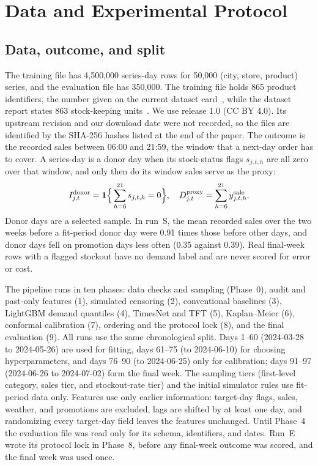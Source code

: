 \section{Data and Experimental Protocol}
\label{sec:data}

\subsection{Data, outcome, and split}
\label{sec:outcome}

The training file has 4,500,000 series-day rows for 50,000 (city, store, product) series, and the evaluation file has 350,000. The training file holds 865 product identifiers, the number given on the current dataset card~\cite{dingdong2025datasetcard}, while the dataset report states 863 stock-keeping units~\cite{wang2025freshretailnet}. We use release 1.0 (CC BY 4.0). Its upstream revision and our download date were not recorded, so the files are identified by the SHA-256 hashes listed at the end of the paper. The outcome is the recorded sales between 06:00 and 21:59, the window that a next-day order has to cover. A series-day is a donor day when its stock-status flags $s_{j,t,h}$ are all zero over that window, and only then do its window sales serve as the proxy:
\begin{equation}
I^{\mathrm{donor}}_{j,t}=\mathbf{1}\Big\{\sum_{h=6}^{21}s_{j,t,h}=0\Big\},\quad
D^{\mathrm{proxy}}_{j,t}=\sum_{h=6}^{21}y^{\mathrm{sale}}_{j,t,h}.
\label{eq:donor}
\end{equation}
Donor days are a selected sample. In run~S, the mean recorded sales over the two weeks before a fit-period donor day were 0.91 times those before other days, and donor days fell on promotion days less often (0.35 against 0.39). Real final-week rows with a flagged stockout have no demand label and are never scored for error or cost.

The pipeline runs in ten phases: data checks and sampling (Phase~0), audit and past-only features (1), simulated censoring (2), conventional baselines (3), LightGBM demand quantiles (4), TimesNet and TFT (5), Kaplan--Meier (6), conformal calibration (7), ordering and the protocol lock (8), and the final evaluation (9). All runs use the same chronological split. Days 1--60 (2024-03-28 to 2024-05-26) are used for fitting, days 61--75 (to 2024-06-10) for choosing hyperparameters, and days 76--90 (to 2024-06-25) only for calibration; days 91--97 (2024-06-26 to 2024-07-02) form the final week. The sampling tiers (first-level category, sales tier, and stockout-rate tier) and the initial simulator rules use fit-period data only. Features use only earlier information: target-day flags, sales, weather, and promotions are excluded, lags are shifted by at least one day, and randomizing every target-day field leaves the features unchanged. Until Phase~4 the evaluation file was read only for its schema, identifiers, and dates. Run~E wrote its protocol lock in Phase~8, before any final-week outcome was scored, and the final week was used once.

